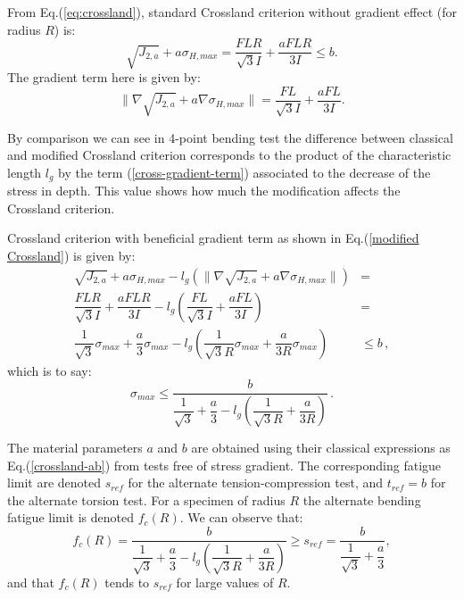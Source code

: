 From Eq.(\ref{eq:crossland}), standard Crossland criterion without gradient effect (for radius $R$) is:
\begin{equation}
	\sqrt{J_{2,a}}+a\sigma_{H,max}=\dfrac{FLR}{\sqrt{3}I} +\dfrac{aFLR}{3I}\leqslant b.
	\label{eq4pcross}
\end{equation}
The gradient term here is given by:
\begin{equation}
	\parallel{\nabla\sqrt{J_{2,a}}}+a{\nabla \sigma_{H,max}}\parallel=\dfrac{FL}{\sqrt{3}I}+\dfrac{aFL}{3I}.
	\label{cross-gradient-term}
\end{equation}

By comparison we can see in 4-point bending test the difference between classical and modified Crossland criterion corresponds to the product of the characteristic length $l_g$ by the term (\ref{cross-gradient-term}) associated to the decrease of the stress in depth. This value shows how much the modification affects the Crossland criterion. 

\noindent Crossland criterion with beneficial gradient term as shown in Eq.(\ref{modified Crossland}) is given by:
\begin{equation}
	\begin{split}
		\sqrt{J_{2,a}}+a\sigma_{H,max}-l_g(\parallel{\nabla\sqrt{J_{2,a}}}+a\nabla{\sigma_{H,max}}\parallel)&=\\ \dfrac{FLR}{\sqrt{3}I} +\dfrac{aFLR}{3I}-l_g\left( \dfrac{FL}{\sqrt{3}I}+\dfrac{aFL}{3I}\right) 
		&=\\ \dfrac{1}{\sqrt{3}}\sigma_{max}+\dfrac{a}{3}\sigma_{max}-l_g\left( \dfrac{1}{\sqrt{3}R}\sigma_{max}+\dfrac{a}{3R}\sigma_{max}\right) &\leqslant b\, ,
	\end{split}
\end{equation}
which is to say:
\begin{equation}
	\sigma_{max}\leqslant\dfrac{b}{\dfrac{1}{\sqrt{3}}+\dfrac{a}{3}-l_g\left( \dfrac{1}{\sqrt{3}R}+\dfrac{a}{3R}\right) }\, .
\end{equation}

The material parameters $a$ and $b$ are obtained using their classical expressions as Eq.(\ref{crossland-ab}) from tests free of stress gradient. The corresponding fatigue limit are denoted $s_{ref}$ for the alternate tension-compression test, and $t_{ref}= b$ for the alternate torsion test. For a specimen of radius $R$
the alternate bending fatigue limit is denoted $f_c(R)$.
We can observe that:
\begin{equation}
	f_c(R)=\dfrac{b}{\dfrac{1}{\sqrt{3}}+\dfrac{a}{3}-l_g\left( \dfrac{1}{\sqrt{3}R}+\dfrac{a}{3R}\right) }\geqslant s_{ref} = \dfrac{b}{\dfrac{1}{\sqrt{3}}+\dfrac{a}{3}},
	\label{crossland-fr}
\end{equation}
and that $f_c(R)$ tends to $s_{ref}$ for large values of $R$.

